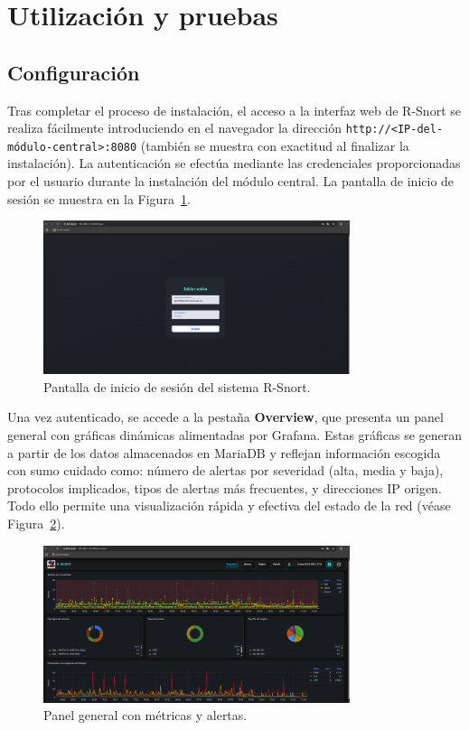 \documentclass[11pt,a4paper,twoside]{report}
\begin{document}
\newpage

\section{Utilización y pruebas}

\subsection{Configuración}

Tras completar el proceso de instalación, el acceso a la interfaz web de R-Snort se realiza fácilmente introduciendo en el navegador la dirección \texttt{http://<IP-del-módulo-central>:8080} (también se muestra con exactitud al finalizar la instalación). La autenticación se efectúa mediante las credenciales proporcionadas por el usuario durante la instalación del módulo central. La pantalla de inicio de sesión se muestra en la Figura~\ref{fig:login-rsnort}.

\begin{figure}[H]
	\centering
	\includegraphics[width=0.8\textwidth]{configuracion/1.png}
	\caption{Pantalla de inicio de sesión del sistema R-Snort.}
	\label{fig:login-rsnort}
\end{figure}

Una vez autenticado, se accede a la pestaña \textbf{Overview}, que presenta un panel general con gráficas dinámicas alimentadas por Grafana. Estas gráficas se generan a partir de los datos almacenados en MariaDB y reflejan información escogida con sumo cuidado como: número de alertas por severidad (alta, media y baja), protocolos implicados, tipos de alertas más frecuentes, y direcciones IP origen. Todo ello permite una visualización rápida y efectiva del estado de la red (véase Figura~\ref{fig:overview-rsnort}).

\begin{figure}[H]
	\centering
	\includegraphics[width=0.8\textwidth]{configuracion/2.png}
	\caption{Panel general con métricas y alertas.}
	\label{fig:overview-rsnort}
\end{figure}
\end{document}
